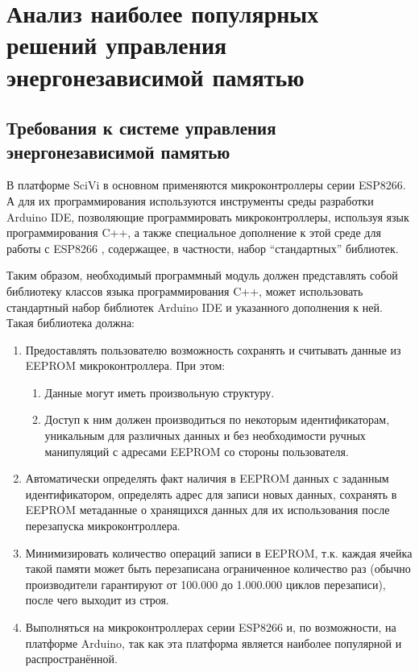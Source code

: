 \chapter{Анализ наиболее популярных решений управления энергонезависимой памятью}

\section{Требования к системе управления энергонезависимой памятью} \label{section:requirements}

В платформе SciVi в основном применяются микроконтроллеры серии ESP8266. А для их программирования используются инструменты среды разработки Arduino IDE, позволяющие программировать микроконтроллеры, используя язык программирования C++, а также специальное дополнение к этой среде для работы с ESP8266 \cite{web:esp-core}, содержащее, в частности, набор "`стандартных"' библиотек.

Таким образом, необходимый программный модуль должен представлять собой библиотеку классов языка программирования C++, может использовать стандартный набор библиотек Arduino IDE и указанного дополнения к ней.
Такая библиотека должна:
\begin{enumerate}
	\item Предоставлять пользователю возможность сохранять и считывать данные из EEPROM микроконтроллера. При этом:
	\begin{enumerate}
		\item Данные могут иметь произвольную структуру.
		\item Доступ к ним должен производиться по некоторым  идентификаторам, уникальным для различных данных и без необходимости ручных манипуляций с адресами EEPROM со стороны пользователя.
	\end{enumerate}
	\item Автоматически определять факт наличия в EEPROM данных с заданным идентификатором, определять адрес для записи новых данных, сохранять в EEPROM метаданные о хранящихся данных для их использования после перезапуска микроконтроллера.
	\item Минимизировать количество операций записи в EEPROM, т.к. каждая ячейка такой памяти может быть перезаписана ограниченное количество раз (обычно производители гарантируют от 100.000 до 1.000.000 циклов перезаписи), после чего выходит из строя.
	\item Выполняться на микроконтроллерах серии ESP8266 и, по возможности, на платформе Arduino, так как эта платформа является наиболее популярной и распространённой.
\end{enumerate}

